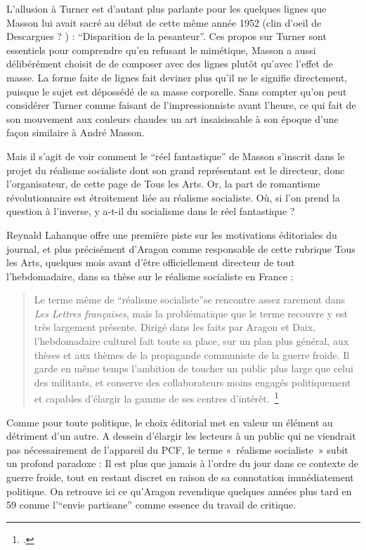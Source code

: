 L’allusion à Turner est d’autant plus parlante pour les quelques lignes que Masson lui avait sacré au début de cette même année 1952 (clin d’oeil de Descargues ? ) : \enquote{Disparition de la pesanteur}. Ces propos sur Turner sont essentiels pour comprendre qu’en refusant le mimétique, Masson a aussi délibérément choisit de de composer avec des lignes plutôt qu’avec l’effet de masse. La forme faite de lignes fait deviner plus qu’il ne le signifie directement, puisque le sujet est dépossédé de sa masse corporelle. Sans compter qu’on peut considérer Turner comme faisant de l’impressionniste avant l’heure, ce qui fait de son mouvement aux couleurs chaudes un art insaisissable à son époque d’une façon similaire à André Masson. 

	Mais il s’agit de voir comment le \enquote{réel fantastique} de Masson s’inscrit dans le projet du réalisme socialiste dont son grand représentant est le directeur, donc l’organisateur, de cette page de Tous les Arts. Or, la part de romantisme révolutionnaire est étroitement liée au réalisme socialiste. Où, si l’on prend la question à l’inverse, y a-t-il du socialisme dans le réel fantastique ? 

	Reynald Lahanque offre une première piste sur les motivations éditoriales du journal, et plus précisément d’Aragon comme responsable de cette rubrique Tous les Arts, quelques mois avant d’être officiellement directeur de tout l’hebdomadaire, dans sa thèse sur le réalisme socialiste en France : 

\begin{quote}
Le terme même de \enquote{réalisme socialiste}se rencontre assez rarement dans \emph{Les Lettres françaises}, mais la problématique que le terme recouvre y est très largement présente. Dirigé dans les faits par Aragon et Daix, l'hebdomadaire culturel fait toute sa place, sur un plan plus général, aux thèses et aux thèmes de la propagande communiste de la guerre froide. Il garde en même temps l'ambition de toucher un public plus large que celui des militants, et conserve des collaborateurs moins engagés politiquement et capables d'élargir la gamme de ses centres d’intérêt. \footcite{}\end{quote}

	Comme pour toute politique, le choix éditorial met en valeur un élément au détriment d’un autre. A dessein d’élargir les lecteurs à un public qui ne viendrait pas nécessairement de l’appareil du PCF, le terme « réalisme socialiste » subit un profond paradoxe : Il est plus que jamais à l’ordre du jour dans ce contexte de guerre froide, tout en restant discret en raison de sa connotation immédiatement politique. On retrouve ici ce qu’Aragon revendique quelques années plus tard en 59 comme l’\enquote{envie partisane} comme essence du travail de critique. 


